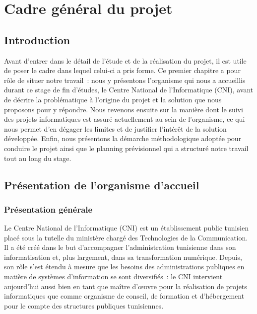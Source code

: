 \chapter{Cadre général du projet}
\label{chap:cadre-general}

\section{Introduction}
\label{sec:introduction}

Avant d'entrer dans le détail de l'étude et de la réalisation du projet, il est utile de poser le cadre dans lequel celui-ci a pris forme. Ce premier chapitre a pour rôle de situer notre travail~: nous y présentons l'organisme qui nous a accueillis durant ce stage de fin d'études, le Centre National de l'Informatique (CNI), avant de décrire la problématique à l'origine du projet et la solution que nous proposons pour y répondre. Nous revenons ensuite sur la manière dont le suivi des projets informatiques est assuré actuellement au sein de l'organisme, ce qui nous permet d'en dégager les limites et de justifier l'intérêt de la solution développée. Enfin, nous présentons la démarche méthodologique adoptée pour conduire le projet ainsi que le planning prévisionnel qui a structuré notre travail tout au long du stage.

\section{Présentation de l'organisme d'accueil}
\label{sec:organisme-accueil}

\subsection{Présentation générale}
\label{subsec:presentation-generale}

Le Centre National de l'Informatique (CNI) est un établissement public tunisien placé sous la tutelle du ministère chargé des Technologies de la Communication. Il a été créé dans le but d'accompagner l'administration tunisienne dans son informatisation et, plus largement, dans sa transformation numérique. Depuis, son rôle s'est étendu à mesure que les besoins des administrations publiques en matière de systèmes d'information se sont diversifiés~: le CNI intervient aujourd'hui aussi bien en tant que maître d'œuvre pour la réalisation de projets informatiques que comme organisme de conseil, de formation et d'hébergement pour le compte des structures publiques tunisiennes.

